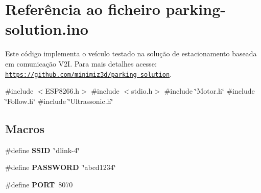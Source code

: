 \hypertarget{parking-solution_8ino}{}\section{Referência ao ficheiro parking-\/solution.ino}
\label{parking-solution_8ino}


Este código implementa o veículo testado na solução de estacionamento baseada em comunicação V2I. Para mais detalhes acesse\+: \href{https://github.com/minimiz3d/parking-solution}{\tt https\+://github.\+com/minimiz3d/parking-\/solution}.  


{\ttfamily \#include $<$E\+S\+P8266.\+h$>$}\newline
{\ttfamily \#include $<$stdio.\+h$>$}\newline
{\ttfamily \#include \char`\"{}Motor.\+h\char`\"{}}\newline
{\ttfamily \#include \char`\"{}Follow.\+h\char`\"{}}\newline
{\ttfamily \#include \char`\"{}Ultrassonic.\+h\char`\"{}}\newline
\subsection*{Macros}
\begin{DoxyCompactItemize}
\item 
\mbox{\label{parking-solution_8ino_aaf46549480a528db5ba7d78e7270b5a9}} 
\#define {\bfseries S\+S\+ID}~\char`\"{}dlink-\/4\char`\"{}
\item 
\mbox{\label{parking-solution_8ino_a9e8538fad4eee548302ad9f60e6d47ca}} 
\#define {\bfseries P\+A\+S\+S\+W\+O\+RD}~\char`\"{}abcd1234\char`\"{}
\item 
\mbox{\label{parking-solution_8ino_a614217d263be1fb1a5f76e2ff7be19a2}} 
\#define {\bfseries P\+O\+RT}~8070
\end{DoxyCompactItemize}
